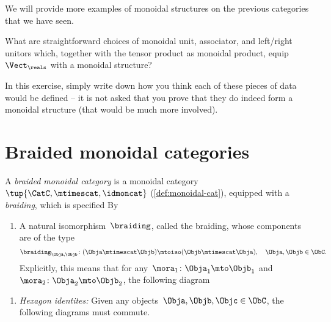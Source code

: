 \begin{publictodo}
	We will provide more examples of monoidal structures on the previous categories that we have seen.
\end{publictodo}

\begin{gradedexercise}
	\label{ex:VectTensorMonStructure}
	What are straightforward choices of monoidal unit, associator, and left/right unitors which, together with the tensor product as monoidal product, equip $\Vect_\reals$ with a monoidal structure?

	In this exercise, simply write down how you think each of these pieces of data would be defined -- it is not asked that you prove that they do indeed form a monoidal structure (that would be much more involved).
\end{gradedexercise}



\section{Braided monoidal categories}


\begin{ctdefinition}
	\label{def:braided_moncat}
	A \emph{braided monoidal category} is a monoidal category~$\tup{\CatC,\mtimescat,\idmoncat}$ (\cref{def:monoidal-cat}), equipped with a \emph{braiding}, which is specified By

	\constit
	\begin{enumerate}
		\item A natural isomorphism~$\braiding$, called the braiding, whose components are of the type
		      \begin{equation}
			      \label{eq:braiding_symmetry}
			      \braiding_{\Obja,\Objb}\colon (\Obja\mtimescat \Objb)\mtoiso (\Objb\mtimescat \Obja), \quad \Obja,\Objb \in \ObC.
		      \end{equation}
		      Explicitly, this means that for any~$\mora_1\colon \Obja_1\mto \Objb_1$ and~$\mora_2\colon \Obja_2\mto \Objb_2$, the following diagram
		      \begin{center}
		      \end{center}
	\end{enumerate}

	\condit
	\begin{enumerate}
		\item \emph{Hexagon identites:} Given any objects~$\Obja,\Objb,\Objc\in \ObC$, the following diagrams must commute.
	\end{enumerate}
	\begin{center}
	\end{center}
	\begin{center}
	\end{center}
\end{ctdefinition}

